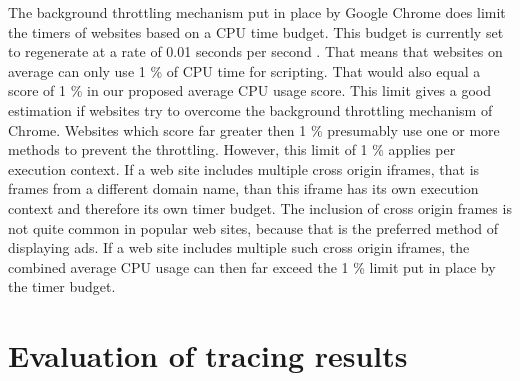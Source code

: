 \documentclass[
	ruledheaders=section,%
	class=report,%
	thesis={type=bachelor},%
	accentcolor=9c,%
	custommargins=true,%
	marginpar=false,%
	parskip=half-,%
	fontsize=11pt,%
]{tudapub}
\begin{document}
  The background throttling mechanism put in place by Google Chrome does limit the timers of websites based on a CPU time budget. This budget is currently set to regenerate at a rate of 0.01 seconds per second \cite{chrome-background-tabs}. That means that websites on average can only use 1 \% of CPU time for scripting. That would also equal a score of 1 \% in our proposed average CPU usage score. This limit gives a good estimation if websites try to overcome the background throttling mechanism of Chrome. Websites which score far greater then 1 \% presumably use one or more methods to prevent the throttling. However, this limit of 1 \% applies per execution context. If a web site includes multiple cross origin iframes, that is frames from a different domain name, than this iframe has its own execution context and therefore its own timer budget. The inclusion of cross origin frames is not quite common in popular web sites, because that is the preferred method of displaying ads. If a web site includes multiple such cross origin iframes, the combined average CPU usage can then far exceed the 1 \% limit put in place by the timer budget.

  
  \section{Evaluation of tracing results}
\end{document}
